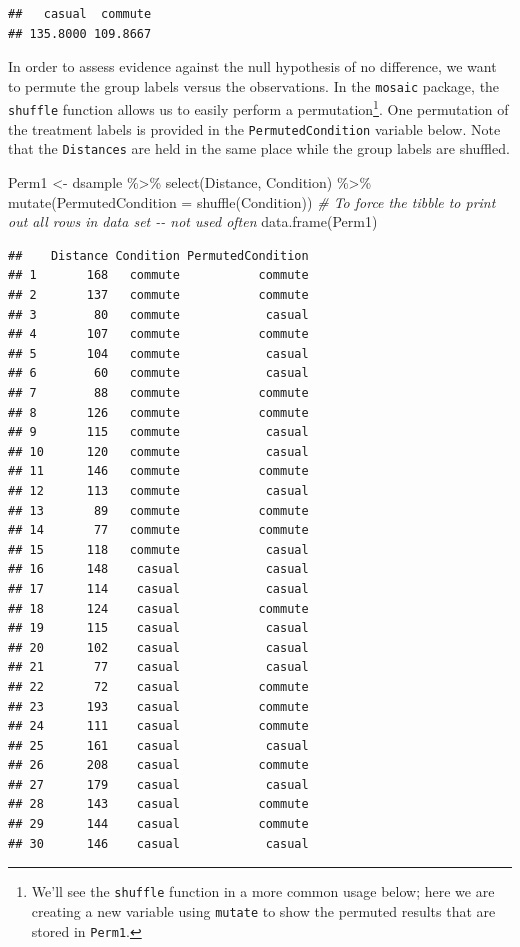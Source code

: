 \documentclass[
]{book}
\newenvironment{Shaded}{\begin{snugshade}}{\end{snugshade}}
\newcommand{\AttributeTok}[1]{\textcolor[rgb]{0.77,0.63,0.00}{#1}}
\newcommand{\CommentTok}[1]{\textcolor[rgb]{0.56,0.35,0.01}{\textit{#1}}}
\newcommand{\FunctionTok}[1]{\textcolor[rgb]{0.00,0.00,0.00}{#1}}
\newcommand{\NormalTok}[1]{#1}
\newcommand{\OtherTok}[1]{\textcolor[rgb]{0.56,0.35,0.01}{#1}}
\newcommand{\SpecialCharTok}[1]{\textcolor[rgb]{0.00,0.00,0.00}{#1}}
\begin{document}
\begin{verbatim}
##   casual  commute 
## 135.8000 109.8667
\end{verbatim}

\indent In order to assess evidence against the null hypothesis of no difference, we want to permute the group labels versus the observations. In the \texttt{mosaic} package, the \texttt{shuffle} function allows us to easily perform
a   permutation\footnote{We'll see the \texttt{shuffle} function in a more common usage below;
  here we are creating a new variable using \texttt{mutate} to show the permuted results that are stored in \texttt{Perm1}.}. One permutation of the
treatment labels is provided in the \texttt{PermutedCondition} variable below. Note
that the \texttt{Distances} are held in the same place while the group labels are shuffled.

\begin{Shaded}
\begin{Highlighting}[]
\NormalTok{Perm1 }\OtherTok{\textless{}{-}}\NormalTok{ dsample }\SpecialCharTok{\%\textgreater{}\%} 
  \FunctionTok{select}\NormalTok{(Distance, Condition) }\SpecialCharTok{\%\textgreater{}\%} 
  \FunctionTok{mutate}\NormalTok{(}\AttributeTok{PermutedCondition =} \FunctionTok{shuffle}\NormalTok{(Condition))}
\CommentTok{\# To force the tibble to print out all rows in data set {-}{-} not used often}
\FunctionTok{data.frame}\NormalTok{(Perm1) }
\end{Highlighting}
\end{Shaded}

\begin{verbatim}
##    Distance Condition PermutedCondition
## 1       168   commute           commute
## 2       137   commute           commute
## 3        80   commute            casual
## 4       107   commute           commute
## 5       104   commute            casual
## 6        60   commute            casual
## 7        88   commute           commute
## 8       126   commute           commute
## 9       115   commute            casual
## 10      120   commute            casual
## 11      146   commute           commute
## 12      113   commute            casual
## 13       89   commute           commute
## 14       77   commute           commute
## 15      118   commute            casual
## 16      148    casual            casual
## 17      114    casual            casual
## 18      124    casual           commute
## 19      115    casual            casual
## 20      102    casual            casual
## 21       77    casual            casual
## 22       72    casual           commute
## 23      193    casual           commute
## 24      111    casual           commute
## 25      161    casual            casual
## 26      208    casual           commute
## 27      179    casual            casual
## 28      143    casual           commute
## 29      144    casual           commute
## 30      146    casual            casual
\end{verbatim}
\end{document}
